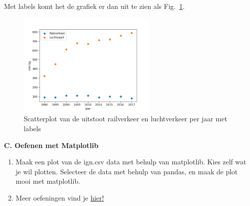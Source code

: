 Met labels komt het de grafiek er dan uit te zien als Fig.~\ref{fig:matplotlib_scatter_2}.

\begin{figure}[h]
\begin{center}
\includegraphics[width=0.6\textwidth]{img/matplotlib_scatter_2.png}
\caption{\label{fig:matplotlib_scatter_2} Scatterplot van de uitstoot railverkeer en luchtverkeer per jaar met labels}
\end{center}
\end{figure}

\textbf{C. Oefenen met Matplotlib}

\begin{enumerate}[label=\textbf{C.\arabic*}]
\item Maak een plot van de ign.csv data met behulp van matplotlib. Kies zelf wat je wil plotten. Selecteer de data met behulp van pandas, en maak de plot mooi met matplotlib. 
\item Meer oefeningen vind je \href{https://www.w3resource.com/graphics/matplotlib/}{hier!}
\end{enumerate}


